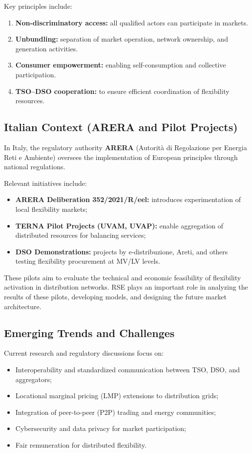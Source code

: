 \documentclass[11pt]{article}
\begin{document}
	Key principles include:
	\begin{enumerate}
		\item \textbf{Non-discriminatory access:} all qualified actors can participate in markets.
		\item \textbf{Unbundling:} separation of market operation, network ownership, and generation activities.
		\item \textbf{Consumer empowerment:} enabling self-consumption and collective participation.
		\item \textbf{TSO–DSO cooperation:} to ensure efficient coordination of flexibility resources.
	\end{enumerate}
	
	\subsection{Italian Context (ARERA and Pilot Projects)}
	
	In Italy, the regulatory authority \textbf{ARERA} (Autorità di Regolazione per Energia Reti e Ambiente) oversees the implementation of European principles through national regulations.
	
	Relevant initiatives include:
	\begin{itemize}
		\item \textbf{ARERA Deliberation 352/2021/R/eel:} introduces experimentation of local flexibility markets;
		\item \textbf{TERNA Pilot Projects (UVAM, UVAP):} enable aggregation of distributed resources for balancing services;
		\item \textbf{DSO Demonstrations:} projects by e-distribuzione, Areti, and others testing flexibility procurement at MV/LV levels.
	\end{itemize}
	
	These pilots aim to evaluate the technical and economic feasibility of flexibility activation in distribution networks.  
	RSE plays an important role in analyzing the results of these pilots, developing models, and designing the future market architecture.
	
	\subsection{Emerging Trends and Challenges}
	
	Current research and regulatory discussions focus on:
	\begin{itemize}
		\item Interoperability and standardized communication between TSO, DSO, and aggregators;
		\item Locational marginal pricing (LMP) extensions to distribution grids;
		\item Integration of peer-to-peer (P2P) trading and energy communities;
		\item Cybersecurity and data privacy for market participation;
		\item Fair remuneration for distributed flexibility.
	\end{itemize}
	
\end{document}
